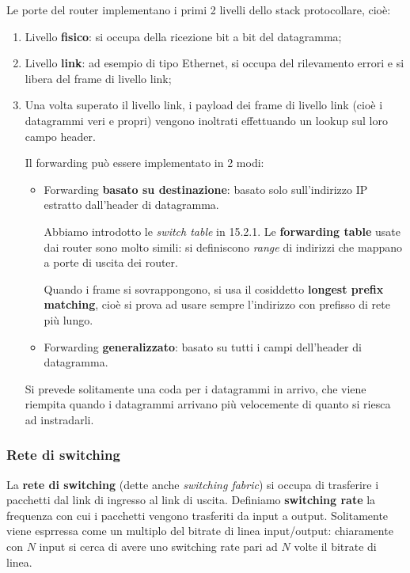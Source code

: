 \documentclass[a4paper,11pt]{article}
\begin{document}
Le porte del router implementano i primi 2 livelli dello stack protocollare, cioè:
\begin{enumerate}
	\item Livello \textbf{fisico}: si occupa della ricezione bit a bit del datagramma;
	\item Livello \textbf{link}: ad esempio di tipo Ethernet, si occupa del rilevamento errori e si libera del frame di livello link;
	\item Una volta superato il livello link, i payload dei frame di livello link (cioè i datagrammi veri e propri) vengono inoltrati effettuando un lookup sul loro campo header. 

		Il forwarding può essere implementato in 2 modi:
		\begin{itemize}
			\item Forwarding \textbf{basato su destinazione}: basato solo sull'indirizzo IP estratto dall'header di datagramma. 

				Abbiamo introdotto le \textit{switch table} in 15.2.1.
Le \textbf{forwarding table} usate dai router sono molto simili: si definiscono \textit{range} di indirizzi che mappano a porte di uscita dei router.

Quando i frame si sovrappongono, si usa il cosiddetto \textbf{longest prefix matching}, cioè si prova ad usare sempre l'indirizzo con prefisso di rete più lungo.
			\item Forwarding \textbf{generalizzato}: basato su tutti i campi dell'header di datagramma.
		\end{itemize}

		Si prevede solitamente una coda per i datagrammi in arrivo, che viene riempita quando i datagrammi arrivano più velocemente di quanto si riesca ad instradarli.
\end{enumerate}

\subsubsection{Rete di switching}
La \textbf{rete di switching} (dette anche \textit{switching fabric}) si occupa di trasferire i pacchetti dal link di ingresso al link di uscita.
Definiamo \textbf{switching rate} la frequenza con cui i pacchetti vengono trasferiti da input a output.
Solitamente viene esprressa come un multiplo del bitrate di linea input/output: chiaramente con $N$ input si cerca di avere uno switching rate pari ad $N$ volte il bitrate di linea.
\end{document}
